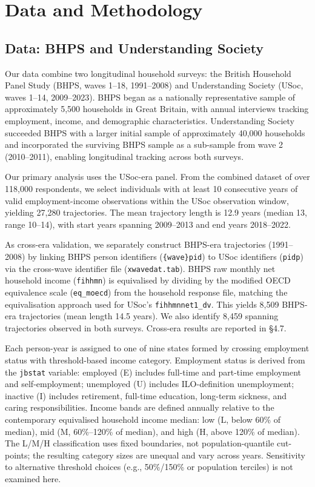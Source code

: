 \section{Data and Methodology}

\subsection{Data: BHPS and Understanding Society}

Our data combine two longitudinal household surveys: the British Household Panel Study (BHPS, waves 1--18, 1991--2008) and Understanding Society (USoc, waves 1--14, 2009--2023). BHPS began as a nationally representative sample of approximately 5,500 households in Great Britain, with annual interviews tracking employment, income, and demographic characteristics. Understanding Society succeeded BHPS with a larger initial sample of approximately 40,000 households and incorporated the surviving BHPS sample as a sub-sample from wave 2 (2010--2011), enabling longitudinal tracking across both surveys.

Our primary analysis uses the USoc-era panel. From the combined dataset of over 118,000 respondents, we select individuals with at least 10 consecutive years of valid employment-income observations within the USoc observation window, yielding 27,280 trajectories. The mean trajectory length is 12.9 years (median 13, range 10--14), with start years spanning 2009--2013 and end years 2018--2022.

As cross-era validation, we separately construct BHPS-era trajectories (1991--2008) by linking BHPS person identifiers (\texttt{\{wave\}pid}) to USoc identifiers (\texttt{pidp}) via the cross-wave identifier file (\texttt{xwavedat.tab}). BHPS raw monthly net household income (\texttt{fihhmn}) is equivalised by dividing by the modified OECD equivalence scale (\texttt{eq\_moecd}) from the household response file, matching the equivalisation approach used for USoc's \texttt{fihhmnnet1\_dv}. This yields 8,509 BHPS-era trajectories (mean length 14.5 years). We also identify 8,459 spanning trajectories observed in both surveys. Cross-era results are reported in \S4.7.

Each person-year is assigned to one of nine states formed by crossing employment status with threshold-based income category. Employment status is derived from the \texttt{jbstat} variable: employed (E) includes full-time and part-time employment and self-employment; unemployed (U) includes ILO-definition unemployment; inactive (I) includes retirement, full-time education, long-term sickness, and caring responsibilities. Income bands are defined annually relative to the contemporary equivalised household income median: low (L, below 60\% of median), mid (M, 60\%--120\% of median), and high (H, above 120\% of median). The L/M/H classification uses fixed boundaries, not population-quantile cut-points; the resulting category sizes are unequal and vary across years. Sensitivity to alternative threshold choices (e.g., 50\%/150\% or population terciles) is not examined here.

